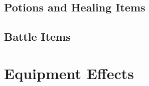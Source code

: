 \clearpage
\subsection{Potions and Healing Items}\label{subsec:potions}

\begin{tabitem}[label=inv-potions]
    
\end{tabitem}
\begin{center}
\end{center}
\clearpage
\subsection{Battle Items}\label{subsec:battleitems}

\begin{tabitem}[label=inv-battles]
    
\end{tabitem}
\begin{center}
\end{center}
\clearpage
\section{Equipment Effects}\label{sec:equipeffects}


